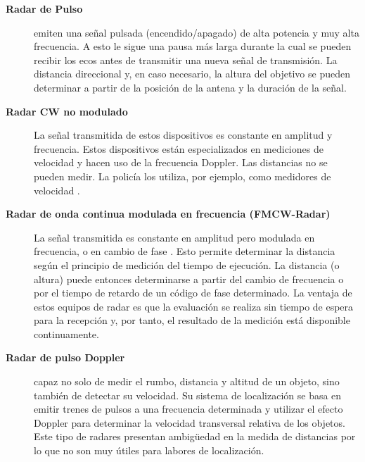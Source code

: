 \begin{description}
  
\item[\bf Radar de Pulso] emiten una señal pulsada (encendido/apagado) de alta potencia y muy alta frecuencia. A esto le sigue una pausa más larga durante la cual se pueden recibir los ecos antes de transmitir una nueva señal de transmisión. La distancia direccional y, en caso necesario, la altura del objetivo se pueden determinar a partir de la posición de la antena y la duración de la señal.

\item [\bf  Radar CW no modulado]
La señal transmitida de estos dispositivos es constante en amplitud y frecuencia. Estos dispositivos están especializados en mediciones de velocidad y hacen uso de la frecuencia Doppler. Las distancias no se pueden medir. La policía los utiliza, por ejemplo, como medidores de velocidad .

 
\item [\bf Radar de onda continua modulada en frecuencia (FMCW-Radar)] 
  La señal transmitida es constante en amplitud pero modulada en frecuencia, o en cambio de fase . Esto permite determinar la distancia según el principio de medición del tiempo de ejecución. La distancia (o altura) puede entonces determinarse a partir del cambio de frecuencia o por el tiempo de retardo de un código de fase determinado. La ventaja de estos equipos de radar es que la evaluación se realiza sin tiempo de espera para la recepción y, por tanto, el resultado de la medición está disponible continuamente.
  


  
\item[\bf Radar de pulso Doppler] capaz no solo de medir el rumbo, distancia y altitud de un objeto, sino también de detectar su velocidad. Su sistema de localización se basa en emitir trenes de pulsos a una frecuencia determinada y utilizar el efecto Doppler para determinar la velocidad transversal relativa de los objetos. Este tipo de radares presentan ambigüedad en la medida de distancias por lo que no son muy útiles para labores de localización. 

  
\end{description}

